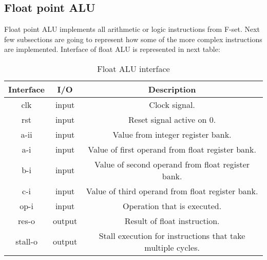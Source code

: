 \documentclass{scrreprt}
\begin{document}
\subsection*{Float point ALU}
Float point ALU implements all arithmetic or logic instructions from F-set. Next few subsections are going to represent how some of the more complex instructions are implemented. 
Interface of float ALU is represented in next table: 
\begin{table}[htb!]
            \centering
            \begin{tabular}{|c|c|c|} \hline 
             Interface & I/O & Description \\ \hline  
             clk & input & Clock signal.  \\ \hline
             rst & input & Reset signal active on 0.  \\ \hline
             a-ii & input & Value from integer register bank.  \\ \hline
             a-i & input & Value of first operand from float register bank.  \\ \hline
             b-i & input & Value of second operand from float register bank.  \\ \hline
             c-i & input & Value of third operand from float register bank.  \\ \hline
             op-i & input & Operation that is executed.  \\ \hline
             res-o & output & Result of float instruction.  \\ \hline
             stall-o & output & Stall execution for instructions that take multiple cycles.  \\ \hline
        \end{tabular}
        \caption{Float ALU interface}
\end{table}
\end{document}

